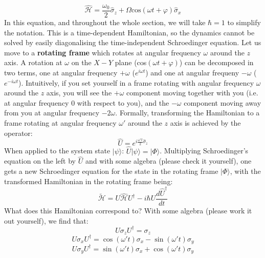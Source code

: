 \documentclass[a4paper,11pt]{article}
\newcommand{\ket}[1]{| #1 \rangle}
\begin{document}
\begin{equation}
    \hat{\mathcal{H}} = \frac{\omega_0}{2}\hat{\sigma}_z + \Omega \mbox{cos} \left ( \omega t + \varphi \right) \hat{\sigma}_x
\end{equation}
In this equation, and throughout the whole section, we will take $\hbar = 1$ to simplify the notation. This is a time-dependent Hamiltonian, so the dynamics cannot be solved by easily diagonalising the time-independent Schroedinger equation.
\newline Let us move to a {\bf rotating frame} which rotates at angular frequency $\omega$ around the $z$ axis. A rotation at $\omega$ on the $X-Y$ plane (cos$(\omega t + \varphi)$) can be decomposed in two terms, one at angular frequency $+\omega$ ($e^{i \omega t}$) and one at angular frequeny $-\omega$ ($e^{-i \omega t}$). Intuitively, if you set yourself in a frame rotating with angular frequency $\omega$ around the $z$ axis, you will see the $+\omega$ component moving together with you (i.e. at angular frequency $0$ with respect to you), and the $-\omega$ component moving away from  you at angular frequency $-2\omega$.
\newline Formally, transforming the Hamiltonian to a frame rotating at angular frequency $\omega'$ around the $z$ axis is achieved by the operator:
\begin{equation}
    \hat{U} = e^{i \frac{\omega' t}{2} \hat{\sigma}_z}
\end{equation}
When applied to the system state $\ket{\psi}$: $\hat{U} \ket{\psi} = \ket{\Phi}$.
Multiplying Schroedinger's equation on the left by $\hat{U}$ and with some algebra (please check it yourself), one gets a new Schroedinger equation for the state in the rotating frame $\ket{\Phi}$, with the transformed Hamiltonian in the rotating frame being:
\begin{equation}
    \widetilde{\mathcal{H}} = U \hat{\mathcal{H}} U^{\dagger} - i \hbar U \frac{d\hat{U}^{\dagger}}{dt}
\end{equation}
\newline What does this Hamiltonian correspond to? With some algebra (please work it out yourself), we find that:
\begin{equation}
    U \sigma_z U^{\dagger} = \sigma_z
\end{equation}
\begin{equation}
    U \sigma_x U^{\dagger} = \cos(\omega' t) \sigma_x - \sin(\omega' t) \sigma_y 
\end{equation}
\begin{equation}
    U \sigma_y U^{\dagger} = \sin(\omega' t) \sigma_x + \cos(\omega' t) \sigma_y
\end{equation}
\end{document}
